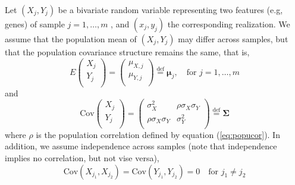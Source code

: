 \documentclass[12pt, a4paper]{article}
\newcommand{\cov}{\text{Cov}}
\begin{document}
	Let $(X_j, Y_j)$ be a bivariate random variable representing two features (e.g, genes) of 
	sample $j = 1, \ldots, m$ , and $(x_j, y_j)$ the corresponding realization.
	We assume that the population mean of $(X_j, Y_j)$ may differ across samples, but that the 
	population covariance structure remains the 
	same, that is,  
	\begin{equation}\label{eq:meanstruct}
	E  \left(\begin{array}{c}
	X_j\\
	Y_j\\	
	\end{array} \right) 
	= 	\left(\begin{array}{c}
	\mu_{X,j}\\
	\mu_{Y,j}\\
	\end{array} \right)\stackrel{\text{def}}{=} \bm \mu_j,  \text{~~ for $j = 1, \ldots, m$}
	\end{equation}
	and 
	\begin{equation}\label{eq:covstruct}
	\cov\left(\begin{array}{c}
	X_j\\
	Y_j\\	
	\end{array} \right)	
	= \left(
	\begin{array}{cc}
	\sigma_X^2 &\rho \sigma_X\sigma_Y \\
	\rho \sigma_X \sigma_Y & 	\sigma_Y^2 \\
	\end{array} 
	\right)
	\stackrel{\text{def}}{=} \bm \Sigma 
	\end{equation}
	where $\rho$ is the population correlation defined by equation (\ref{eq:popucor}). In addition, 
	we assume independence across samples (note that independence implies no correlation, but not 
	vise versa), 
	\begin{equation}\label{eq:indepsamples}
	\cov(X_{j_1}, X_{j_2}) = \cov(Y_{j_1}, Y_{j_2}) = 0 \text{~~~for $j_1\neq j_2$}
	\end{equation}
	
	
	
	
	
\end{document}
